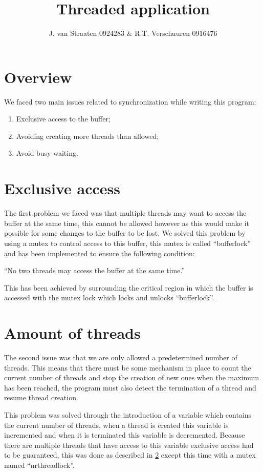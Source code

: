 \documentclass[a4paper,10pt]{article}
\title{Threaded application}
\author{J. van Straaten 0924283 \& R.T. Verschuuren 0916476}
\begin{document}
\maketitle

\section{Overview}
We faced two main issues related to synchronization while writing this program:

\begin{enumerate}
 \item Exclusive access to the buffer;
 \item Avoiding creating more threads than allowed;
 \item Avoid busy waiting.
\end{enumerate}

\section{Exclusive access} \label{sec1}
The first problem we faced was that multiple threads may want to access the buffer at the same time, this cannot be allowed however as this would make it possible for some changes to the buffer to be lost. We solved this problem by using a mutex to control access to this buffer, this mutex is called ``bufferlock'' and has been implemented to ensure the following condition:

``No two threads may access the buffer at the same time.''

This has been achieved by surrounding the critical region in which the buffer is accessed with the mutex lock which locks and unlocks ``bufferlock''.

\section{Amount of threads}
The second issue was that we are only allowed a predetermined number of threads. This means that there must be some mechanism in place to count the current number of threads and stop the creation of new ones when the maximum has been reached, the program must also detect the termination of a thread and resume thread creation.

This problem was solved through the introduction of a variable which contains the current number of threads, when a thread is created this variable is incremented and when it is terminated this variable is decremented. Because there are multiple threads that have access to this variable exclusive access had to be guaranteed, this was done as described in \ref{sec1} except this time with a mutex named ``nrthreadlock''.
\end{document}
